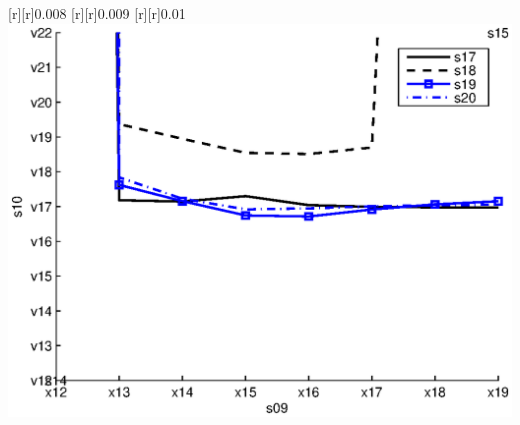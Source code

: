 \begin{psfrags}
[r][r]{0.008}%
[r][r]{0.009}%
[r][r]{0.01}%
%
\includegraphics[width=15cm]{mrmse_det_30.eps}%
\end{psfrags}%
%
